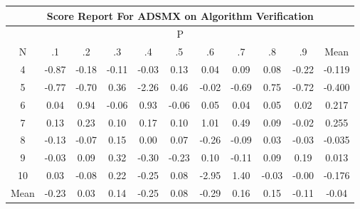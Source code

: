 \documentclass[11pt,a4paper]{report}
\begin{document}
\begin{longtable}{ | c || c | c | c | c | c | c | c | c | c || c |}
\hline
\multicolumn{11}{|c|}{ Score Report For ADSMX on Algorithm Verification} \\
\hline
\multicolumn{11}{|c|}{ P } \\
\hline
N & .1 & .2 & .3 & .4 & .5 & .6 & .7 & .8 & .9 & Mean\\
 \hline
 \hline
 \endhead
  4 &  \cellcolor[HTML]{FFE7E7} -0.87 &  \cellcolor[HTML]{FFF7F7} -0.18 &  \cellcolor[HTML]{FFFFFF} -0.11 &  \cellcolor[HTML]{FFFFFF} -0.03 &  \cellcolor[HTML]{FFFFFF} 0.13 &  \cellcolor[HTML]{FFFFFF} 0.04 &  \cellcolor[HTML]{FFFFFF} 0.09 &  \cellcolor[HTML]{FFFFFF} 0.08 &  \cellcolor[HTML]{FFF7F7} -0.22 & -0.119 \\
  5 &  \cellcolor[HTML]{FFEFEF} -0.77 &  \cellcolor[HTML]{FFEFEF} -0.70 &  \cellcolor[HTML]{F7F7FF} 0.36 &  \cellcolor[HTML]{FFC7C7} -2.26 &  \cellcolor[HTML]{F7F7FF} 0.46 &  \cellcolor[HTML]{FFFFFF} -0.02 &  \cellcolor[HTML]{FFEFEF} -0.69 &  \cellcolor[HTML]{EFEFFF} 0.75 &  \cellcolor[HTML]{FFEFEF} -0.72 & -0.400 \\
  6 &  \cellcolor[HTML]{FFFFFF} 0.04 &  \cellcolor[HTML]{E7E7FF} 0.94 &  \cellcolor[HTML]{FFFFFF} -0.06 &  \cellcolor[HTML]{E7E7FF} 0.93 &  \cellcolor[HTML]{FFFFFF} -0.06 &  \cellcolor[HTML]{FFFFFF} 0.05 &  \cellcolor[HTML]{FFFFFF} 0.04 &  \cellcolor[HTML]{FFFFFF} 0.05 &  \cellcolor[HTML]{FFFFFF} 0.02 & 0.217 \\
  7 &  \cellcolor[HTML]{FFFFFF} 0.13 &  \cellcolor[HTML]{F7F7FF} 0.23 &  \cellcolor[HTML]{FFFFFF} 0.10 &  \cellcolor[HTML]{F7F7FF} 0.17 &  \cellcolor[HTML]{FFFFFF} 0.10 &  \cellcolor[HTML]{E7E7FF} 1.01 &  \cellcolor[HTML]{EFEFFF} 0.49 &  \cellcolor[HTML]{FFFFFF} 0.09 &  \cellcolor[HTML]{FFFFFF} -0.02 & 0.255 \\
  8 &  \cellcolor[HTML]{FFFFFF} -0.13 &  \cellcolor[HTML]{FFFFFF} -0.07 &  \cellcolor[HTML]{FFFFFF} 0.15 &  \cellcolor[HTML]{FFFFFF} 0.00 &  \cellcolor[HTML]{FFFFFF} 0.07 &  \cellcolor[HTML]{FFF7F7} -0.26 &  \cellcolor[HTML]{FFFFFF} -0.09 &  \cellcolor[HTML]{FFFFFF} 0.03 &  \cellcolor[HTML]{FFFFFF} -0.03 & -0.035 \\
  9 &  \cellcolor[HTML]{FFFFFF} -0.03 &  \cellcolor[HTML]{FFFFFF} 0.09 &  \cellcolor[HTML]{F7F7FF} 0.32 &  \cellcolor[HTML]{FFF7F7} -0.30 &  \cellcolor[HTML]{FFF7F7} -0.23 &  \cellcolor[HTML]{FFFFFF} 0.10 &  \cellcolor[HTML]{FFFFFF} -0.11 &  \cellcolor[HTML]{FFFFFF} 0.09 &  \cellcolor[HTML]{F7F7FF} 0.19 & 0.013 \\
  10 &  \cellcolor[HTML]{FFFFFF} 0.03 &  \cellcolor[HTML]{FFFFFF} -0.08 &  \cellcolor[HTML]{F7F7FF} 0.22 &  \cellcolor[HTML]{FFF7F7} -0.25 &  \cellcolor[HTML]{FFFFFF} 0.08 &  \cellcolor[HTML]{FFB7B7} -2.95 &  \cellcolor[HTML]{DFDFFF} 1.40 &  \cellcolor[HTML]{FFFFFF} -0.03 &  \cellcolor[HTML]{FFFFFF} -0.00 & -0.176 \\
 \hline
 \hline
Mean &  \cellcolor[HTML]{FFF7F7} -0.23 &  \cellcolor[HTML]{FFFFFF} 0.03 &  \cellcolor[HTML]{FFFFFF} 0.14 &  \cellcolor[HTML]{FFF7F7} -0.25 &  \cellcolor[HTML]{FFFFFF} 0.08 &  \cellcolor[HTML]{FFF7F7} -0.29 &  \cellcolor[HTML]{F7F7FF} 0.16 &  \cellcolor[HTML]{FFFFFF} 0.15 &  \cellcolor[HTML]{FFFFFF} -0.11 &  \cellcolor[HTML]{FFFFFF} -0.04
\end{longtable}
\end{document}
